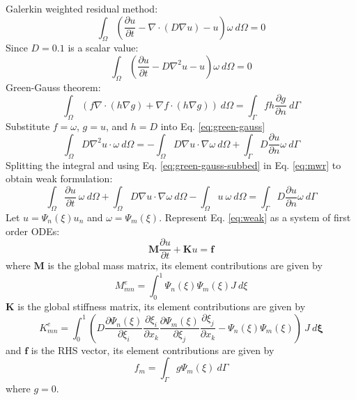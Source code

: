 \documentclass[11pt, a4paper]{article}
\newcommand{\Psim}{\ensuremath{\Psi_m(\xi)}}
\newcommand{\Psin}{\ensuremath{\Psi_n(\xi)}}
\begin{document}
  Galerkin weighted residual method:
  \begin{equation*}
  \int_{\Omega} \left(\frac{\partial u}{\partial t} - \nabla \cdot (D \nabla u) 
  - u \right) \omega \: d\Omega = 0
  \end{equation*}
  Since $D = 0.1$ is a scalar value:
  \begin{equation} \label{eq:mwr}
  \int_{\Omega} \left(\frac{\partial u}{\partial t} - D \nabla^2 u - u 
  \right) \omega \: d\Omega = 0
  \end{equation}
  Green-Gauss theorem:
  \begin{equation} \label{eq:green-gauss}
  \int_{\Omega} (f \nabla \cdot (h\nabla g) + \nabla f \cdot (h \nabla g)) \: 
  d\Omega = \int_{\Gamma} f h \frac{\partial g}{\partial n} \: d\Gamma
  \end{equation}
  Substitute $f = \omega$, $g = u$, and $h = D$ into Eq. \eqref{eq:green-gauss}
  \begin{equation} \label{eq:green-gauss-subbed}
  \int_{\Omega} D\nabla^2 u \cdot \omega \: d\Omega = -\int_{\Omega} D\nabla 
  u \cdot \nabla \omega \: d\Omega + \int_{\Gamma} D \frac{\partial 
  u}{\partial n} \omega \: d\Gamma
  \end{equation}
  Splitting the integral and using Eq. \eqref{eq:green-gauss-subbed} in Eq. 
  \eqref{eq:mwr} to obtain weak formulation:
  \begin{equation} \label{eq:weak}
  \int_{\Omega} \frac{\partial u}{\partial t} \: \omega \: d\Omega + 
  \int_{\Omega} D\nabla u \cdot \nabla \omega \: d\Omega - \int_{\Omega} u \: 
  \omega \: d\Omega = \int_{\Gamma} D \frac{\partial u}{\partial n} \omega \: 
  d\Gamma
  \end{equation}
  Let $u = \Psin u_n$ and $\omega = \Psim$. Represent Eq. 
  \eqref{eq:weak} as a system of first order ODEs:
  \begin{equation}
  \mathbf{M} \frac{\partial u}{\partial t} + \mathbf{K}u = \mathbf{f}
  \end{equation}
  where $\mathbf{M}$ is the global mass matrix, its element contributions are 
  given by
  \begin{equation}
  M_{mn}^e = \int_{0}^{1}\Psin \Psim J \: d\xi
  \end{equation}
  $\mathbf{K}$ is the global stiffness matrix, its element contributions are 
  given by
  \begin{equation}
  K_{mn}^e = \int_{0}^{1} \left(D \frac{\partial \Psin}{\partial \xi_i} 
  \frac{\partial \xi_i}{\partial x_k} \frac{\partial \Psim}{\partial \xi_j} 
  \frac{\partial \xi_j}{\partial x_k} -\Psin \Psim \right)\: J \: d\bm{\xi}
  \end{equation}
  and $\mathbf{f}$ is the RHS vector, its element contributions are given by
  \begin{equation}
  f_m = \int_{\Gamma} g \Psim \: d\Gamma
  \end{equation}
  where $g=0$.
\end{document}
